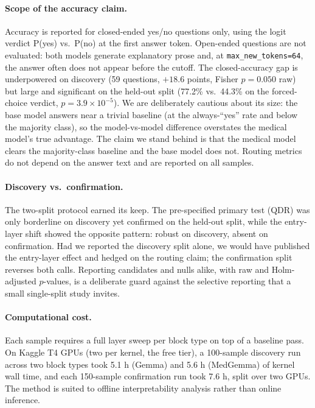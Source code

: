 \paragraph{Scope of the accuracy claim.}
Accuracy is reported for closed-ended yes/no questions only, using the logit verdict
P(yes) vs.\ P(no) at the first answer token. Open-ended questions are not evaluated:
both models generate explanatory prose and, at \texttt{max\_new\_tokens=64}, the
answer often does not appear before the cutoff. The closed-accuracy gap is
underpowered on discovery (59 questions, $+18.6$ points, Fisher $p{=}0.050$ raw) but
large and significant on the held-out split (77.2\% vs.\ 44.3\% on the forced-choice verdict,
$p{=}3.9{\times}10^{-5}$). We are deliberately cautious about its size: the base model
answers near a trivial baseline (at the always-``yes'' rate and below the majority
class), so the model-vs-model difference overstates the medical model's true advantage.
The claim we stand behind is that the medical model clears the majority-class baseline
and the base model does not. Routing metrics do not depend on the answer text and are
reported on all samples.

\paragraph{Discovery vs.\ confirmation.}
The two-split protocol earned its keep. The pre-specified primary test (QDR) was only
borderline on discovery yet confirmed on the held-out split, while the entry-layer
shift showed the opposite pattern: robust on discovery, absent on confirmation. Had
we reported the discovery split alone, we would have published the entry-layer effect
and hedged on the routing claim; the confirmation split reverses both calls. Reporting
candidates and nulls alike, with raw and Holm-adjusted $p$-values, is a deliberate
guard against the selective reporting that a small single-split study invites.

\paragraph{Computational cost.}
Each sample requires a full layer sweep per block type on top of a baseline pass. On
Kaggle T4 GPUs (two per kernel, the free tier), a 100-sample discovery run across two block
types took 5.1 h (Gemma) and 5.6 h (MedGemma) of kernel wall time, and each 150-sample
confirmation run took 7.6 h, split over two GPUs. The method is suited to offline interpretability
analysis rather than online inference.


